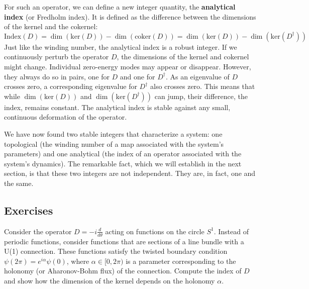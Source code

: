 For such an operator, we can define a new integer quantity, the \textbf{analytical index} (or Fredholm index).
It is defined as the difference between the dimensions of the kernel and the cokernel:
\begin{equation}
    \text{Index}(D) = \dim(\text{ker}(D)) - \dim(\text{coker}(D)) = \dim(\text{ker}(D)) - \dim(\text{ker}(D^\dagger))
    \label{eq:analytical_index}
\end{equation}
Just like the winding number, the analytical index is a robust integer.
If we continuously perturb the operator $D$, the dimensions of the kernel and cokernel might change.
Individual zero-energy modes may appear or disappear.
However, they always do so in pairs, one for $D$ and one for $D^\dagger$.
As an eigenvalue of $D$ crosses zero, a corresponding eigenvalue for $D^\dagger$ also crosses zero.
This means that while $\dim(\text{ker}(D))$ and $\dim(\text{ker}(D^\dagger))$ can jump, their difference, the index, remains constant.
The analytical index is stable against any small, continuous deformation of the operator.

We have now found two stable integers that characterize a system: one topological (the winding number of a map associated with the system's parameters) and one analytical (the index of an operator associated with the system's dynamics).
The remarkable fact, which we will establish in the next section, is that these two integers are not independent.
They are, in fact, one and the same.

\subsection*{Exercises}

\begin{exercise}
    Consider the operator $D = -i \frac{d}{d\theta}$ acting on functions on the circle $S^1$.
    Instead of periodic functions, consider functions that are sections of a line bundle with a U(1) connection.
    These functions satisfy the twisted boundary condition $\psi(2\pi) = e^{i\alpha}\psi(0)$, where $\alpha \in [0, 2\pi)$ is a parameter corresponding to the holonomy (or Aharonov-Bohm flux) of the connection.
    Compute the index of $D$ and show how the dimension of the kernel depends on the holonomy $\alpha$.
\end{exercise}

